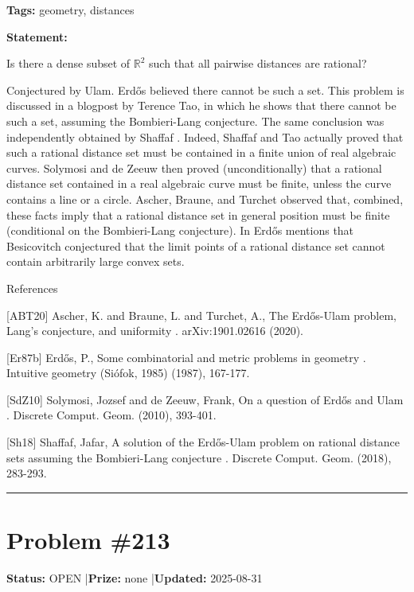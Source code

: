 \documentclass{article}
\begin{document}
\noindent\textbf{Tags:} geometry, distances

\medskip

\noindent\textbf{Statement:}

Is there a dense subset of $\mathbb{R}^2$ such that all pairwise distances are rational?




Conjectured by Ulam. Erd\H{o}s believed there cannot be such a set. This problem is discussed in a blogpost by Terence Tao, in which he shows that there cannot be such a set, assuming the Bombieri-Lang conjecture. The same conclusion was independently obtained by Shaffaf \cite{Sh18}. Indeed, Shaffaf and Tao actually proved that such a rational distance set must be contained in a finite union of real algebraic curves. Solymosi and de Zeeuw \cite{SdZ10} then proved (unconditionally) that a rational distance set contained in a real algebraic curve must be finite, unless the curve contains a line or a circle. Ascher, Braune, and Turchet \cite{ABT20} observed that, combined, these facts imply that a rational distance set in general position must be finite (conditional on the Bombieri-Lang conjecture). In \cite{Er87b} Erd\H{o}s mentions that Besicovitch conjectured that the limit points of a rational distance set cannot contain arbitrarily large convex sets.




References

[ABT20] Ascher, K. and Braune, L. and Turchet, A., The Erd\H{o}s-Ulam problem, Lang's conjecture, and uniformity . arXiv:1901.02616 (2020).

[Er87b] Erd\H{o}s, P., Some combinatorial and metric problems in geometry . Intuitive geometry (Si\'{o}fok, 1985) (1987), 167-177.

[SdZ10] Solymosi, Jozsef and de Zeeuw, Frank, On a question of Erd\H{o}s and Ulam . Discrete Comput. Geom. (2010), 393-401.

[Sh18] Shaffaf, Jafar, A solution of the Erd\H{o}s-Ulam problem on rational distance sets assuming the Bombieri-Lang conjecture . Discrete Comput. Geom. (2018), 283-293.

\noindent\rule{\linewidth}{0.4pt}


\section{Problem \#213}
\label{prob:213}

\noindent\textbf{Status:} OPEN \quad|\quad \textbf{Prize:} none \quad|\quad \textbf{Updated:} 2025-08-31
\end{document}
